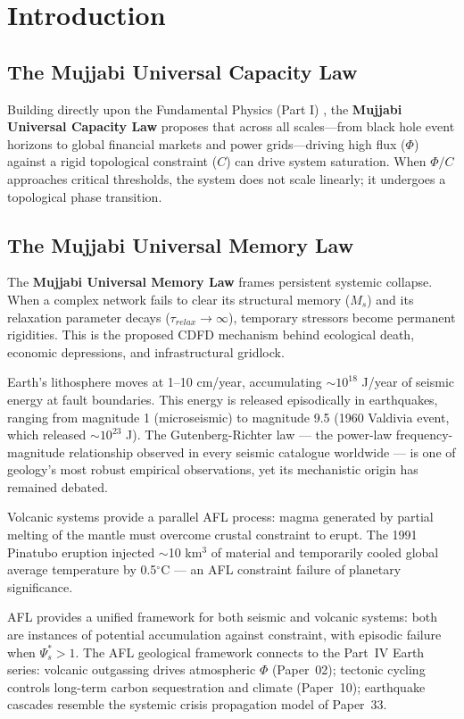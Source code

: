 \documentclass[11pt]{article}
\begin{document}
\section{Introduction}


\subsection{The Mujjabi Universal Capacity Law}
Building directly upon the Fundamental Physics (Part I) \cite{MujjabiPartI2026}, the \textbf{Mujjabi Universal Capacity Law} proposes that across all scales---from black hole event horizons to global financial markets and power grids---driving high flux ($\Phi$) against a rigid topological constraint ($C$) can drive system saturation. When $\Phi/C$ approaches critical thresholds, the system does not scale linearly; it undergoes a topological phase transition.

\subsection{The Mujjabi Universal Memory Law}
The \textbf{Mujjabi Universal Memory Law} frames persistent systemic collapse. When a complex network fails to clear its structural memory ($M_s$) and its relaxation parameter decays ($\tau_{relax} \to \infty$), temporary stressors become permanent rigidities. This is the proposed CDFD mechanism behind ecological death, economic depressions, and infrastructural gridlock.


Earth's lithosphere moves at 1--10 cm/year, accumulating $\sim10^{18}$ J/year of seismic energy
at fault boundaries. This energy is released episodically in earthquakes, ranging from magnitude
1 (microseismic) to magnitude 9.5 (1960 Valdivia event, which released $\sim10^{23}$ J). The
Gutenberg-Richter law --- the power-law frequency-magnitude relationship observed in every seismic
catalogue worldwide --- is one of geology's most robust empirical observations, yet its mechanistic
origin has remained debated.

Volcanic systems provide a parallel AFL process: magma generated by partial melting of the mantle
must overcome crustal constraint to erupt. The 1991 Pinatubo eruption injected $\sim$10 km$^3$
of material and temporarily cooled global average temperature by 0.5$^\circ$C --- an AFL constraint
failure of planetary significance.

AFL provides a unified framework for both seismic and volcanic systems: both are instances of
potential accumulation against constraint, with episodic failure when $\Psi_s^* > 1$. The AFL
geological framework connects to the Part~IV Earth series: volcanic outgassing drives atmospheric
$\Phi$ (Paper~02); tectonic cycling controls long-term carbon sequestration and climate (Paper~10);
earthquake cascades resemble the systemic crisis propagation model of Paper~33.
\end{document}
